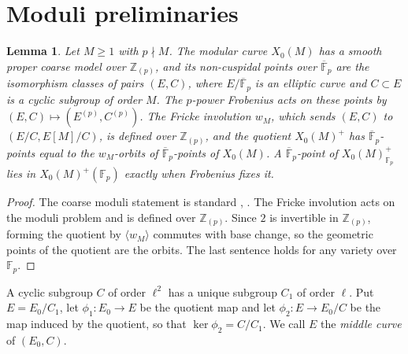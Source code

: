\documentclass[11pt,a4paper]{article}
\newtheorem{lemma}[theorem]{Lemma}
\theoremstyle{remark}\newtheorem{remark}[theorem]{Remark}
\numberwithin{equation}{section}
\newcommand{\Fp}{\mathbb F_p}
\newcommand{\kk}{\overline{\mathbb F}_p}
\begin{document}
\section{Moduli preliminaries}
\begin{lemma}\label{lem:moduli}
Let $M\geq1$ with $p\nmid M$. The modular curve $X_0(M)$ has a smooth proper coarse model over $\mathbb Z_{(p)}$, and its non-cuspidal points over $\kk$ are the isomorphism classes of pairs $(E,C)$, where $E/\kk$ is an elliptic curve and $C\subset E$ is a cyclic subgroup of order $M$. The $p$-power Frobenius acts on these points by $(E,C)\mapsto(E^{(p)},C^{(p)})$. The Fricke involution $w_M$, which sends $(E,C)$ to $(E/C,E[M]/C)$, is defined over $\mathbb Z_{(p)}$, and the quotient $X_0(M)^+$ has $\kk$-points equal to the $w_M$-orbits of $\kk$-points of $X_0(M)$. A $\kk$-point of $X_0(M)^+_{\Fp}$ lies in $X_0(M)^+(\Fp)$ exactly when Frobenius fixes it.
\end{lemma}
\begin{proof}
The coarse moduli statement is standard \cite[VI]{DR}, \cite[Ch.~8]{KM}. The Fricke involution acts on the moduli problem and is defined over $\mathbb Z_{(p)}$. Since $2$ is invertible in $\mathbb Z_{(p)}$, forming the quotient by $\langle w_M\rangle$ commutes with base change, so the geometric points of the quotient are the orbits. The last sentence holds for any variety over $\Fp$.
\end{proof}

A cyclic subgroup $C$ of order $\ell^2$ has a unique subgroup $C_1$ of order $\ell$. Put $E=E_0/C_1$, let $\phi_1\colon E_0\to E$ be the quotient map and let $\phi_2\colon E\to E_0/C$ be the map induced by the quotient, so that $\ker\phi_2=C/C_1$. We call $E$ the \emph{middle curve} of $(E_0,C)$.
\end{document}
